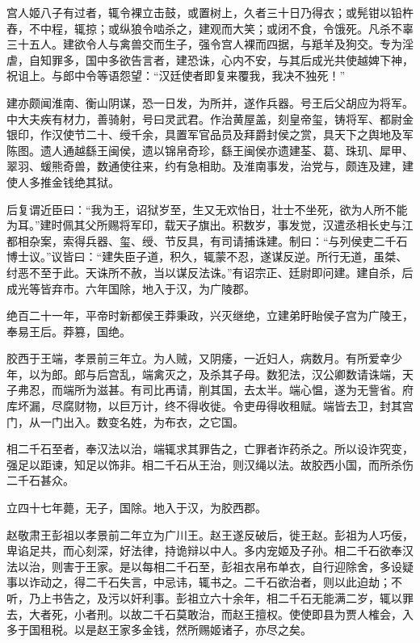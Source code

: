 \documentclass[12pt,UTF8]{ctexbook}
\begin{document}
宫人姬八子有过者，辄令裸立击鼓，或置树上，久者三十日乃得衣；或髡钳以铅杵舂，不中程，辄掠；或纵狼令啮杀之，建观而大笑；或闭不食，令饿死。凡杀不辜三十五人。建欲令人与禽兽交而生子，强令宫人裸而四据，与羝羊及狗交。专为淫虐，自知罪多，国中多欲告言者，建恐诛，心内不安，与其后成光共使越婢下神，祝诅上。与郎中令等语怨望：“汉廷使者即复来覆我，我决不独死！”



建亦颇闻淮南、衡山阴谋，恐一日发，为所并，遂作兵器。号王后父胡应为将军。中大夫疾有材力，善骑射，号曰灵武君。作治黄屋盖，刻皇帝玺，铸将军、都尉金银印，作汉使节二十、绶千余，具置军官品员及拜爵封侯之赏，具天下之舆地及军陈图。遗人通越繇王闽侯，遗以锦帛奇珍，繇王闽侯亦遗建荃、葛、珠玑、犀甲、翠羽、蝯熊奇兽，数通使往来，约有急相助。及淮南事发，治党与，颇连及建，建使人多推金钱绝其狱。



后复谓近臣曰：“我为王，诏狱岁至，生又无欢怡日，壮士不坐死，欲为人所不能为耳。”建时佩其父所赐将军印，载天子旗出。积数岁，事发觉，汉遣丞相长史与江都相杂案，索得兵器、玺、绶、节反具，有司请捕诛建。制曰：“与列侯吏二千石博士议。”议皆曰：“建失臣子道，积久，辄蒙不忍，遂谋反逆。所行无道，虽桀、纣恶不至于此。天诛所不赦，当以谋反法诛。”有诏宗正、廷尉即问建。建自杀，后成光等皆弃市。六年国除，地入于汉，为广陵郡。



绝百二十一年，平帝时新都侯王莽秉政，兴灭继绝，立建弟盱眙侯子宫为广陵王，奉易王后。莽篡，国绝。



胶西于王端，孝景前三年立。为人贼，又阴痿，一近妇人，病数月。有所爱幸少年，以为郎。郎与后宫乱，端禽灭之，及杀其子母。数犯法，汉公卿数请诛端，天子弗忍，而端所为滋甚。有司比再请，削其国，去太半。端心愠，遂为无訾省。府库坏漏，尽腐财物，以巨万计，终不得收徙。令吏毋得收租赋。端皆去卫，封其宫门，从一门出入。数变名姓，为布衣，之它国。



相二千石至者，奉汉法以治，端辄求其罪告之，亡罪者诈药杀之。所以设诈究变，强足以距谏，知足以饰非。相二千石从王治，则汉绳以法。故胶西小国，而所杀伤二千石甚众。



立四十七年薨，无子，国除。地入于汉，为胶西郡。



赵敬肃王彭祖以孝景前二年立为广川王。赵王遂反破后，徙王赵。彭祖为人巧佞，卑谄足共，而心刻深，好法律，持诡辩以中人。多内宠姬及子孙。相二千石欲奉汉法以治，则害于王家。是以每相二千石至，彭祖衣帛布单衣，自行迎除舍，多设疑事以诈动之，得二千石失言，中忌讳，辄书之。二千石欲治者，则以此迫劫；不听，乃上书告之，及污以奸利事。彭祖立六十余年，相二千石无能满二岁，辄以罪去，大者死，小者刑。以故二千石莫敢治，而赵王擅权。使使即县为贾人榷会，入多于国租税。以是赵王家多金钱，然所赐姬诸子，亦尽之矣。
\end{document}
